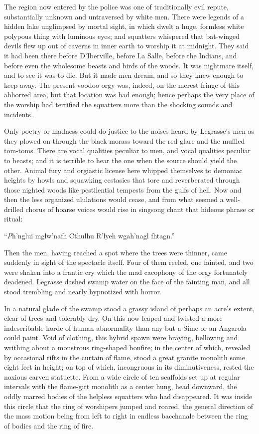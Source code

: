 The region now entered by the police was one of traditionally evil repute, substantially unknown and untraversed by white men. There were legends of a hidden lake unglimpsed by mortal sight, in which dwelt a huge, formless white polypous thing with luminous eyes; and squatters whispered that bat-winged devils flew up out of caverns in inner earth to worship it at midnight. They said it had been there before D’Iberville, before La Salle, before the Indians, and before even the wholesome beasts and birds of the woods. It was nightmare itself, and to see it was to die. But it made men dream, and so they knew enough to keep away. The present voodoo orgy was, indeed, on the merest fringe of this abhorred area, but that location was bad enough; hence perhaps the very place of the worship had terrified the squatters more than the shocking sounds and incidents.

Only poetry or madness could do justice to the noises heard by Legrasse’s men as they plowed on through the black morass toward the red glare and the muffled tom-toms. There are vocal qualities peculiar to men, and vocal qualities peculiar to beasts; and it is terrible to hear the one when the source should yield the other. Animal fury and orgiastic license here whipped themselves to demoniac heights by howls and squawking ecstasies that tore and reverberated through those nighted woods like pestilential tempests from the gulfs of hell. Now and then the less organized ululations would cease, and from what seemed a well-drilled chorus of hoarse voices would rise in singsong chant that hideous phrase or ritual:

\beginblockquote
“{\emph Ph’nglui mglw’nafh Cthulhu R’lyeh wgah’nagl fhtagn.}”
\endblockquote

Then the men, having reached a spot where the trees were thinner, came suddenly in sight of the spectacle itself. Four of them reeled, one fainted, and two were shaken into a frantic cry which the mad cacophony of the orgy fortunately deadened. Legrasse dashed swamp water on the face of the fainting man, and all stood trembling and nearly hypnotized with horror.

In a natural glade of the swamp stood a grassy island of perhaps an acre’s extent, clear of trees and tolerably dry. On this now leaped and twisted a more indescribable horde of human abnormality than any but a Sime or an Angarola could paint. Void of clothing, this hybrid spawn were braying, bellowing and writhing about a monstrous ring-shaped bonfire; in the center of which, revealed by occasional rifts in the curtain of flame, stood a great granite monolith some eight feet in height; on top of which, incongruous in its diminutiveness, rested the noxious carven statuette. From a wide circle of ten scaffolds set up at regular intervals with the flame-girt monolith as a center hung, head downward, the oddly marred bodies of the helpless squatters who had disappeared. It was inside this circle that the ring of worshipers jumped and roared, the general direction of the mass motion being from left to right in endless bacchanale between the ring of bodies and the ring of fire.


